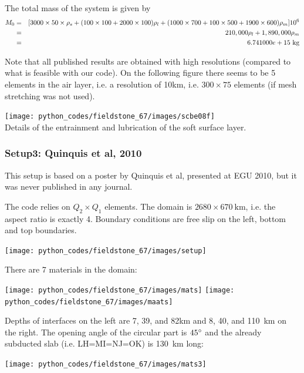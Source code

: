 The total mass of the system is given by
\begin{eqnarray}
M_0 &=& [3000\times 50\times \rho_s + (100\times 100+ 2000\times 100)\rho_l + 
(1000\times 700 + 100\times 500 + 1900\times 600)\rho_m] 10^6\nn\\
&=&210,000 \rho_l + 1,890,000 \rho_m \nn\\
&=&6.741000e+15~\si{\kg}
\end{eqnarray}

Note that all published results are obtained with high resolutions (compared to what is 
feasible with our code). On the following figure there seems to be 5 elements in the air layer, 
i.e. a resolution of 10km, i.e. $300\times 75$ elements (if mesh stretching was not used).
\begin{center}
\texttt{[image: python\_codes/fieldstone\_67/images/scbe08f]}\\
{\captionfont Details of the entrainment and lubrication of the soft surface layer.}
\end{center}

\subsubsection*{Setup3: Quinquis et al, 2010}

This setup is based on a poster by Quinquis et al, presented at EGU 2010, but it
was never published in any journal.

The code relies on $Q_2\times Q_1$ elements. 
The domain is $2680\times 670~\si{\km}$, i.e. the aspect ratio is exactly 4.
Boundary conditions are free slip on the left, bottom and top boundaries. 

\begin{center}
\texttt{[image: python\_codes/fieldstone\_67/images/setup]}
\end{center}

There are 7 materials in the domain:
\begin{center}
\texttt{[image: python\_codes/fieldstone\_67/images/mats]}
\texttt{[image: python\_codes/fieldstone\_67/images/maats]}
\end{center}

Depths of interfaces on the left are 7, 39, and 82\si{\km} and 
8, 40, and 110~\si{\km} on the right.
The opening angle of the circular part is $45\degree$ and the 
already subducted slab (i.e. LH=MI=NJ=OK) is 130~\si{\km} long:

\begin{center}
\texttt{[image: python\_codes/fieldstone\_67/images/mats3]}
\end{center}

